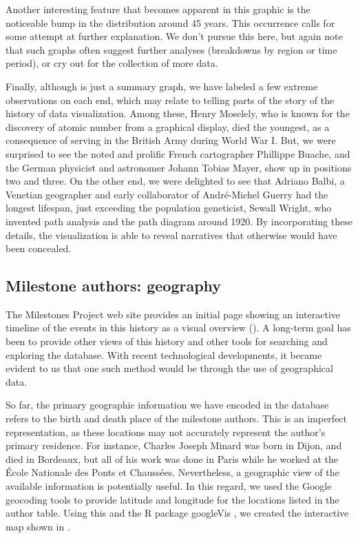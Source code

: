 Another interesting feature that becomes apparent in this graphic is the noticeable bump in the distribution around 45 years. This occurrence calls for some attempt at further explanation. We don't pursue this here, but again note that such graphs often suggest further analyses (breakdowns by region or time period), or cry out for the collection of more data.

Finally, although  is just a summary graph, we have labeled a few extreme observations on each end, which may relate to telling parts of the story of the history of data visualization.  Among these, Henry Moselely, who is known for the discovery of atomic number from a graphical display, died the youngest, as a consequence of serving in the British Army during World War I. But, we were surprised to see the noted and prolific French cartographer Phillippe Buache, and the German physicist and astronomer Johann Tobias Mayer, show up in positions two and three.  On the other end, we were delighted to see that Adriano Balbi, a Venetian geographer and early collaborator of Andr{\'e}-Michel Guerry \citep{BalbiGuerry:1829} had the longest lifespan, just exceeding the population geneticist, Sewall Wright, who invented path analysis and the path diagram around 1920.  By incorporating these details, the visualization is able to reveal narratives that otherwise would have been concealed.

\subsection{Milestone authors: geography}\label{sec:geography}
The Milestones Project web site provides an initial page showing an interactive timeline of the events in this history as a visual overview (). A long-term goal has been to provide other views of this history and other tools for searching and exploring the database. With recent technological developments, it became evident to us that one such method would be through the use of geographical data.

So far, the primary geographic information we have encoded in the database refers to the birth and death place of the milestone authors. This is an imperfect representation, as these locations may not accurately represent the author's primary residence.  For instance, Charles Joseph Minard was born in Dijon, and died in Bordeaux, but all of his work was done in Paris while he worked at the {\'E}cole Nationale des Ponts et Chauss{\'e}es. Nevertheless, a geographic view of the available information is potentially useful. In this regard, we used the Google geocoding tools to provide latitude and longitude for the locations listed in the author table.  Using this and the R package googleVis \citep{googleVis}, we created the interactive map shown in .

